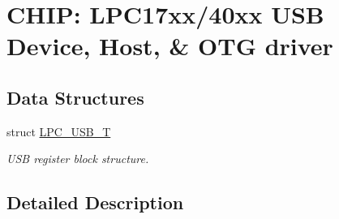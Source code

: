 \hypertarget{group__USB__17XX__40XX}{\section{C\-H\-I\-P\-: L\-P\-C17xx/40xx U\-S\-B Device, Host, \& O\-T\-G driver}
\label{group__USB__17XX__40XX}
}
\subsection*{Data Structures}
\begin{DoxyCompactItemize}
\item 
struct \hyperlink{structLPC__USB__T}{L\-P\-C\-\_\-\-U\-S\-B\-\_\-\-T}
\begin{DoxyCompactList}\small\item\em U\-S\-B register block structure. \end{DoxyCompactList}\end{DoxyCompactItemize}


\subsection{Detailed Description}
